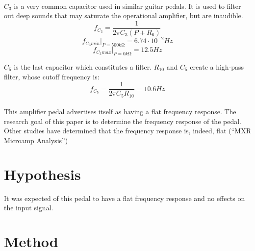 \documentclass[a4paper, 12pt]{article}
\begin{document}
\paragraph*{}
$C_3$ is a very common capacitor used in similar guitar pedals. It is used to 
filter out deep sounds that may saturate the operational amplifier, but are 
inaudible.
$$f_{C_3} = \frac{1}{2 \pi C_3 (P + R_6)}$$
$$f_{C_3 min} |_{P = 500\si{k\ohm}} = 6.74 \cdot 10^{-2} \si{Hz}$$
$$f_{C_3 max} |_{P = 0\si{k\ohm}} = 12.5 \si{Hz}$$

$C_5$ is the last capacitor which constitutes a filter. $R_{10}$ and $C_5$ 
create a high-pass filter, whose cutoff frequency is:
$$f_{C_5} = \frac{1}{2 \pi C_5 R_{10}} = 10.6 \si{Hz}$$

\paragraph*{}
This amplifier pedal advertises itself as having a flat frequency response. 
The research goal of this paper is to determine the frequency response of the 
pedal. Other studies have determined that the frequency response is, indeed, 
flat (``MXR Microamp Analysis'')

\section{Hypothesis}
\paragraph*{}
It was expected of this pedal to have a flat frequency response and no effects 
on the input signal.

\section{Method}
\end{document}
